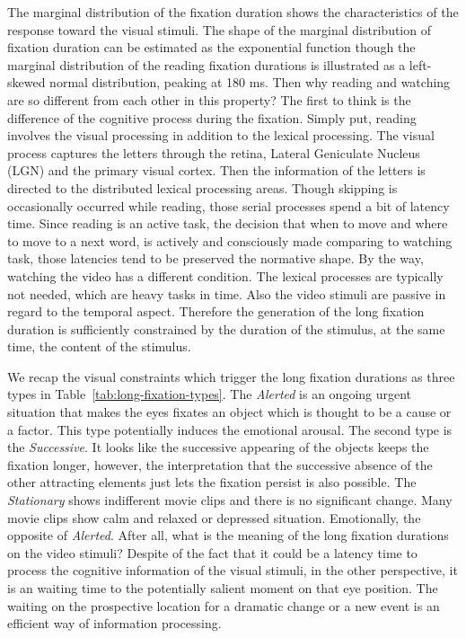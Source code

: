 \documentclass[oneside,master]{snueethesis}
\begin{document}
The marginal distribution of the fixation duration shows the characteristics of the response toward the visual stimuli. The shape of the marginal distribution of fixation duration can be estimated as the exponential function though the marginal distribution of the reading fixation durations is illustrated as a left-skewed normal distribution, peaking at 180 ms. Then why reading and watching are so different from each other in this property? The first to think is the difference of the cognitive process during the fixation. Simply put, reading involves the visual processing in addition to the lexical processing. The visual process captures the letters through the retina, Lateral Geniculate Nucleus (LGN) and the primary visual cortex. Then the information of the letters is directed to the distributed lexical processing areas. Though skipping is occasionally occurred while reading, those serial processes spend a bit of latency time. Since reading is an active task, the decision that when to move and where to move to a next word, is actively and consciously made comparing to watching task, those latencies tend to be preserved the normative shape. By the way, watching the video has a different condition. The lexical processes are typically not needed, which are heavy tasks in time. Also the video stimuli are passive in regard to the temporal aspect. Therefore the generation of the long fixation duration is sufficiently constrained by the duration of the stimulus, at the same time, the content of the stimulus. 

We recap the visual constraints which trigger the long fixation durations as three types in Table~\ref{tab:long-fixation-types}. The \textit{Alerted} is an ongoing urgent situation that makes the eyes fixates an object which is thought to be a cause or a factor. This type potentially induces the emotional arousal. The second type is the \textit{Successive}. It looks like the successive appearing of the objects keeps the fixation longer, however, the interpretation that the successive absence of the other attracting elements just lets the fixation persist is also possible. The \textit{Stationary} shows indifferent movie clips and there is no significant change. Many movie clips show calm and relaxed or depressed situation. Emotionally, the opposite of \textit{Alerted}. After all, what is the meaning of the long fixation durations on the video stimuli? Despite of the fact that it could be a latency time to process the cognitive information of the visual stimuli, in the other perspective, it is an waiting time to the potentially salient moment on that eye position. The waiting on the prospective location for a dramatic change or a new event is an efficient way of information processing.
\end{document}
